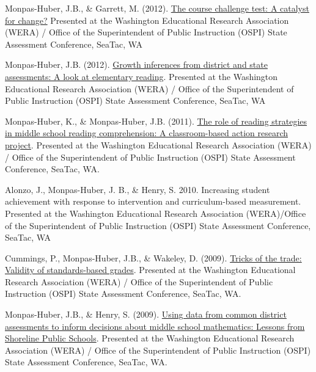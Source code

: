 \documentclass[
  letterpaper,
]{article}
\begin{document}
Monpas-Huber, J.B., \& Garrett, M. (2012).
\href{https://github.com/jackbhuber/talks/blob/e29d26d1897bea6b8e85a731fa404f2f6baf9dac/2012_TheCourseChallengeTest_WERA_1212.pdf}{The
course challenge test: A catalyst for change?} Presented at the
Washington Educational Research Association (WERA) / Office of the
Superintendent of Public Instruction (OSPI) State Assessment Conference,
SeaTac, WA

Monpas-Huber, J.B. (2012).
\href{https://github.com/jackbhuber/talks/blob/fc79815b144a95ac781ac74fc4e42a126c07aad5/2012_GrowthInferencesFromDistrictStateAssessments_WERA_032912.pdf}{Growth
inferences from district and state assessments: A look at elementary
reading}. Presented at the Washington Educational Research Association
(WERA) / Office of the Superintendent of Public Instruction (OSPI) State
Assessment Conference, SeaTac, WA

Monpas-Huber, K., \& Monpas-Huber, J.B. (2011).
\href{https://github.com/jackbhuber/talks/blob/63f14dba2745facb110eadd9864dc46183a78dac/2011_ReadingStrategies_WERA_1211.pdf}{The
role of reading strategies in middle school reading comprehension: A
classroom-based action research project}. Presented at the Washington
Educational Research Association (WERA) / Office of the Superintendent
of Public Instruction (OSPI) State Assessment Conference, SeaTac, WA.

Alonzo, J., Monpas-Huber, J. B., \& Henry, S. 2010. Increasing student
achievement with response to intervention and curriculum-based
measurement. Presented at the Washington Educational Research
Association (WERA)/Office of the Superintendent of Public Instruction
(OSPI) State Assessment Conference, SeaTac, WA

Cummings, P., Monpas-Huber, J.B., \& Wakeley, D. (2009).
\href{https://github.com/jackbhuber/talks/blob/7267589f0c2a24a6c38329cf25dcec707cd7c0c5/2009_ValidityofStdsBasedGrades_WERA_1209.pdf}{Tricks
of the trade: Validity of standards-based grades}. Presented at the
Washington Educational Research Association (WERA) / Office of the
Superintendent of Public Instruction (OSPI) State Assessment Conference,
SeaTac, WA.

Monpas-Huber, J.B., \& Henry, S. (2009).
\href{https://github.com/jackbhuber/talks/blob/8faba1d70054c5536da9b4a3944a37688d5749ad/2009_JBMH\%26Henry_Common\%20Assessments_WERA_1209.pdf}{Using
data from common district assessments to inform decisions about middle
school mathematics: Lessons from Shoreline Public Schools}. Presented at
the Washington Educational Research Association (WERA) / Office of the
Superintendent of Public Instruction (OSPI) State Assessment Conference,
SeaTac, WA.
\end{document}
